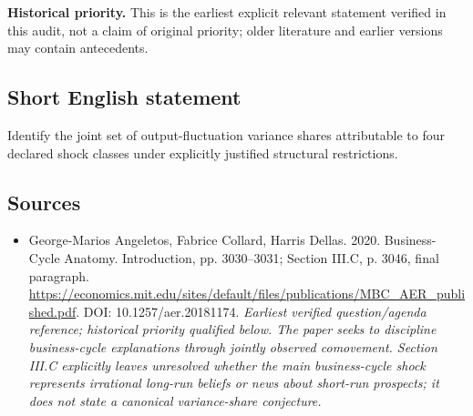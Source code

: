 \documentclass[11pt]{article}
\begin{document}
\par\textbf{Historical priority.} This is the earliest explicit relevant statement verified in this audit, not a claim of original priority; older literature and earlier versions may contain antecedents.

\subsection{Short English statement}
Identify the joint set of output-fluctuation variance shares attributable to four declared shock classes under explicitly justified structural restrictions.

\subsection{Sources}
\begin{itemize}\raggedright
\item[\textnormal{[S1]}]\hypertarget{source:30007512:1}{} George-Marios Angeletos, Fabrice Collard, Harris Dellas. 2020. Business-Cycle Anatomy. Introduction, pp. 3030–3031; Section III.C, p. 3046, final paragraph.
\url{https://economics.mit.edu/sites/default/files/publications/MBC_AER_published.pdf}.
DOI: 10.1257/aer.20181174.
{\small\textit{Earliest verified question/agenda reference; historical priority qualified below. The paper seeks to discipline business-cycle explanations through jointly observed comovement. Section III.C explicitly leaves unresolved whether the main business-cycle shock represents irrational long-run beliefs or news about short-run prospects; it does not state a canonical variance-share conjecture.}}
\end{itemize}
\end{document}
